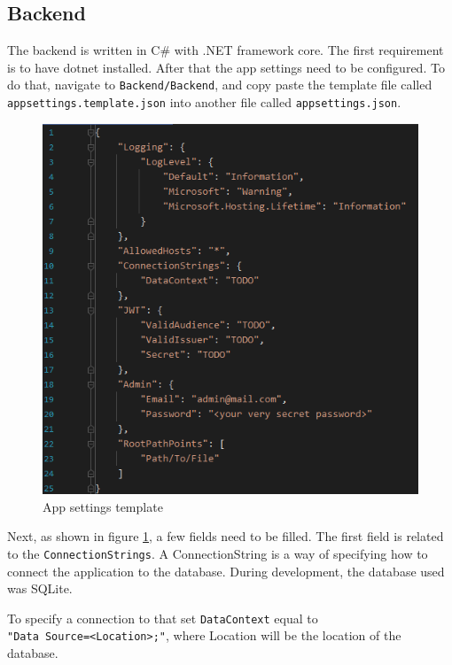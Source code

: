 \subsection{Backend}
The backend is written in C\# with .NET framework core. The first requirement is to have dotnet installed. After that the app settings need to be configured. To do that, navigate to \verb|Backend/Backend|, and copy paste the template file called \verb|appsettings.template.json| into another file called \verb|appsettings.json|.

\begin{figure}[htbp]
	\centering
		\includegraphics[scale=0.85]{./figures/chapter4/appsettings_template.png}
	\caption{App settings template}
	\label{FigAppSettingsTemplate}
\end{figure}

Next, as shown in figure \ref{FigAppSettingsTemplate}, a few fields need to be filled. The first field is related to the \verb|ConnectionStrings|. A ConnectionString is a way of specifying how to connect the application to the database. During development, the database used was SQLite. 

To specify a connection to that set \verb|DataContext| equal to \\ \verb|"Data Source=<Location>;"|, where Location will be the location of the \\ database. 

